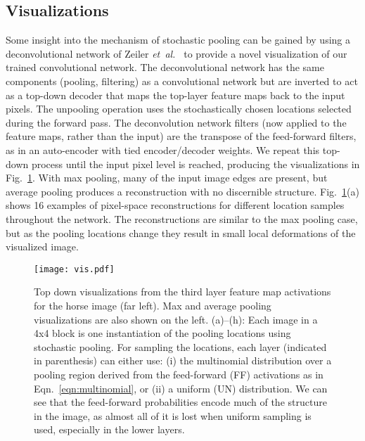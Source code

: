 \documentclass{article} \usepackage{nips12submit_e,times}
\newcommand{\eqn}[1]{Eqn.~\ref{eqn:#1}}
\newcommand{\fig}[1]{Fig.~\ref{fig:#1}}
\def\etal{{\textit{et~al.~}}}
\begin{document}
\subsection{Visualizations}
\vspace{-2mm}
Some insight into the mechanism of stochastic pooling can be gained by using a deconvolutional
network of Zeiler \etal \cite{Zeiler11} to provide a novel visualization of our trained
convolutional network. The deconvolutional network has the same components (pooling, filtering) as a
convolutional network but are inverted to act as a top-down decoder that maps the top-layer feature
maps back to
the input pixels. The unpooling operation uses the stochastically chosen locations selected during
the forward pass. The deconvolution network filters (now applied to the feature maps, rather than
the input) are the transpose of the feed-forward filters, as in an auto-encoder with tied
encoder/decoder weights. We repeat this top-down process until the input pixel level is reached, producing
the visualizations in \fig{viscifar}. With max pooling, many of the input image edges are present,
but average pooling produces a reconstruction with no discernible structure.  \fig{viscifar}(a)
shows 16 examples of pixel-space reconstructions for different location samples throughout the
network. The reconstructions are similar to the max pooling case, but as the pooling locations
change they result in small local deformations of the visualized image.


















\begin{figure}[h!]
\vspace*{-0.3cm}
\begin{center}
\texttt{[image: vis.pdf]}
\end{center}
\vspace*{-0.5cm}
\caption{Top down visualizations from the third layer feature map
  activations for the horse image (far left). Max and average pooling
  visualizations are also shown on the left. (a)--(h): Each image in a
  4x4 block is one instantiation of the pooling locations using
  stochastic pooling. For sampling the locations, each layer
  (indicated in parenthesis) can either use: (i) the multinomial
  distribution over a pooling region derived from the feed-forward
  (FF) activations as in \eqn{multinomial}, or (ii) a uniform (UN)
  distribution. We can see that the
  feed-forward probabilities encode much of the structure in the
  image, as almost all of it is lost when uniform sampling is used, especially in
  the lower layers. }
\label{fig:viscifar}
\vspace*{-3mm}
\end{figure}
\end{document}
